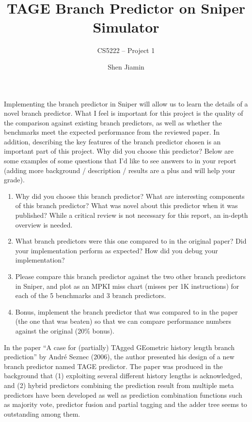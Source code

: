 \documentclass[screen,nonacm,sigconf]{acmart}
\begin{document}
\title{
  TAGE Branch Predictor on Sniper Simulator
}
\subtitle{
  CS5222 -- Project 1
}

\author{Shen Jiamin}

\maketitle

\cite{Seznec06jilp}

Implementing the branch predictor in Sniper will allow us to learn the details of a novel
branch predictor. What I feel is important for this project is the quality of the comparison
against existing branch predictors, as well as whether the benchmarks meet the expected
performance from the reviewed paper. In addition, describing the key features of the
branch predictor chosen is an important part of this project. Why did you choose this
predictor? Below are some examples of some questions that I’d like to see answers to in
your report (adding more background / description / results are a plus and will help your
grade).
\begin{enumerate}
  \item Why did you choose this branch predictor? What are interesting components of this
        branch predictor? What was novel about this predictor when it was published?
        While a critical review is not necessary for this report, an in-depth overview is
        needed.
  \item What branch predictors were this one compared to in the original paper? Did your
        implementation perform as expected? How did you debug your implementation?
  \item Please compare this branch predictor against the two other branch predictors in
        Sniper, and plot as an MPKI miss chart (misses per 1K instructions) for each of the 5
        benchmarks and 3 branch predictors.
  \item Bonus, implement the branch predictor that was compared to in the paper (the one
        that was beaten) so that we can compare performance numbers against the original
        (20\% bonus).
\end{enumerate}




In the paper ``A case for (partially) TAgged GEometric history length branch
prediction'' \cite{Seznec06jilp} by Andr{\'e} Seznec (2006),
the author presented his design of a new branch predictor named TAGE predictor.
The paper was produced in the background that
(1) exploiting several different history lengths is acknowledged, and
(2) hybrid predictors combining the prediction result from multiple meta predictors have been developed as well as prediction combination functions such as majority vote, predictor fusion and partial tagging and the adder tree seems to outstanding among them.
\end{document}

